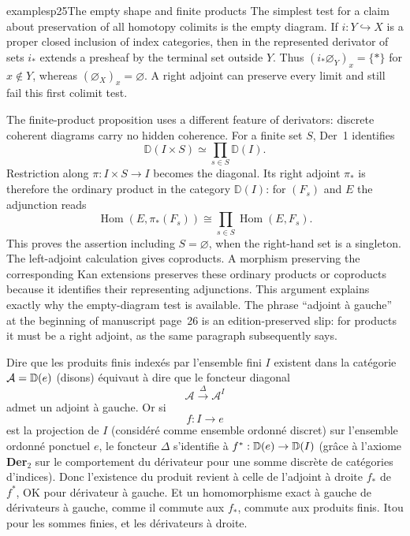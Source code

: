 

\begin{dcomment}{examples}{p25}{The empty shape and finite products}
The simplest test for a claim about preservation of all homotopy colimits
is the empty diagram. If $i:Y\hookrightarrow X$ is a proper closed
inclusion of index categories, then in the represented derivator of sets
$i_*$ extends a presheaf by the terminal set outside $Y$. Thus
$(i_*\varnothing_Y)_x=\{*\}$ for $x\notin Y$, whereas
$(\varnothing_X)_x=\varnothing$. A right adjoint can preserve every limit
and still fail this first colimit test.

The finite-product proposition uses a different feature of derivators:
discrete coherent diagrams carry no hidden coherence. For a finite set
$S$, Der~1 identifies
\[
 \mathbb D(I\times S)\simeq\prod_{s\in S}\mathbb D(I).
\]
Restriction along $\pi:I\times S\to I$ becomes the diagonal. Its right
adjoint $\pi_*$ is therefore the ordinary product in the category
$\mathbb D(I)$: for $(F_s)$ and $E$ the adjunction reads
\[
 \operatorname{Hom}(E,\pi_*(F_s))
 \cong\prod_{s\in S}\operatorname{Hom}(E,F_s).
\]
This proves the assertion including $S=\varnothing$, when the right-hand
set is a singleton. The left-adjoint calculation gives coproducts. A
morphism preserving the corresponding Kan extensions preserves these
ordinary products or coproducts because it identifies their representing
adjunctions. This argument explains exactly why the empty-diagram test is
available. The phrase ``adjoint \`a gauche'' at the beginning of manuscript
page~26 is an edition-preserved slip: for products it must be a right
adjoint, as the same paragraph subsequently says.
\end{dcomment}


Dire que les produits finis indexés par l'ensemble fini $I$ existent dans la catégorie $\mathcal{A} = \mathbb{D}(e)$ (disons) équivaut à dire que le foncteur diagonal
\[
\mathcal{A} \xrightarrow{\Delta} \mathcal{A}^I
\]
admet un adjoint à gauche. Or si
\[
f : I \to e
\]
est la projection de $I$ (considéré comme ensemble ordonné discret) sur l'ensemble ordonné ponctuel $e$, le foncteur $\Delta$ s'identifie à $f^* : \mathbb{D}(e) \to \mathbb{D}(I)$ (grâce à l'axiome \textbf{Der}$_2$ sur le comportement du dérivateur pour une somme discrète de catégories d'indices). Donc l'existence du produit revient à celle de l'adjoint à droite $f_*$ de $f^*$, OK pour dérivateur à gauche. Et un homomorphisme exact à gauche de dérivateurs à gauche, comme il commute aux $f_*$, commute aux produits finis. Itou pour les sommes finies, et les dérivateurs à droite.

